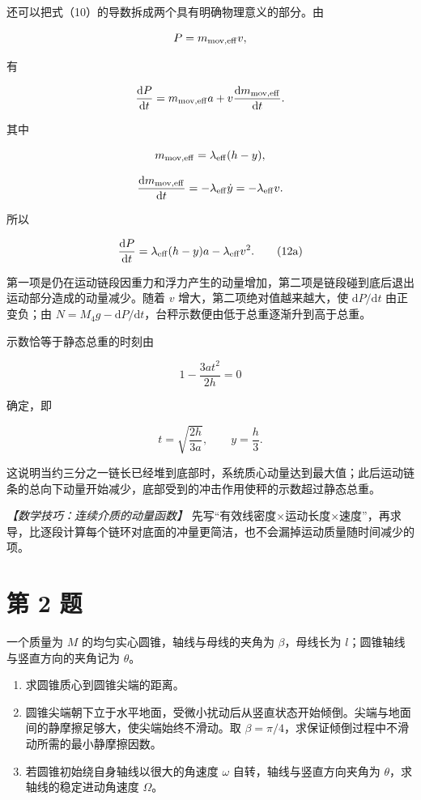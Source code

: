 \documentclass[12pt,a4paper,UTF8]{ctexart}
\newcommand{\tightlist}{\setlength{\itemsep}{0pt}\setlength{\parskip}{0pt}}
\begin{document}
还可以把式（10）的导数拆成两个具有明确物理意义的部分。由

\[P=m_{\rm mov,eff}v,\]

有

\[\frac{\mathrm dP}{\mathrm dt}
=m_{\rm mov,eff}a+v\frac{\mathrm dm_{\rm mov,eff}}{\mathrm dt}.\]

其中

\[m_{\rm mov,eff}=\lambda_{\rm eff}(h-y),\]

\[\frac{\mathrm dm_{\rm mov,eff}}{\mathrm dt}
=-\lambda_{\rm eff}\dot y
=-\lambda_{\rm eff}v.\]

所以

\[\frac{\mathrm dP}{\mathrm dt}
=\lambda_{\rm eff}(h-y)a-\lambda_{\rm eff}v^2. \tag{12a}\]

第一项是仍在运动链段因重力和浮力产生的动量增加，第二项是链段碰到底后退出运动部分造成的动量减少。随着
\(v\) 增大，第二项绝对值越来越大，使 \(\mathrm dP/\mathrm dt\)
由正变负；由
\(N=M_4g-\mathrm dP/\mathrm dt\)，台秤示数便由低于总重逐渐升到高于总重。

示数恰等于静态总重的时刻由

\[1-\frac{3at^2}{2h}=0\]

确定，即

\[t=\sqrt{\frac{2h}{3a}},\qquad y=\frac h3.\]

这说明当约三分之一链长已经堆到底部时，系统质心动量达到最大值；此后运动链条的总向下动量开始减少，底部受到的冲击作用使秤的示数超过静态总重。

\emph{【数学技巧：连续介质的动量函数】}
先写``有效线密度×运动长度×速度''，再求导，比逐段计算每个链环对底面的冲量更简洁，也不会漏掉运动质量随时间减少的项。

\newpage

\section{第 2 题}\label{ux7b2c-2-ux9898}

一个质量为 \(M\) 的均匀实心圆锥，轴线与母线的夹角为 \(\beta\)，母线长为
\(l\)；圆锥轴线与竖直方向的夹角记为 \(\theta\)。

\begin{enumerate}
\def\labelenumi{\arabic{enumi}.}
\tightlist
\item
  求圆锥质心到圆锥尖端的距离。
\item
  圆锥尖端朝下立于水平地面，受微小扰动后从竖直状态开始倾倒。尖端与地面间的静摩擦足够大，使尖端始终不滑动。取
  \(\beta=\pi/4\)，求保证倾倒过程中不滑动所需的最小静摩擦因数。
\item
  若圆锥初始绕自身轴线以很大的角速度 \(\omega\)
  自转，轴线与竖直方向夹角为 \(\theta\)，求轴线的稳定进动角速度
  \(\Omega\)。
\end{enumerate}
\end{document}
